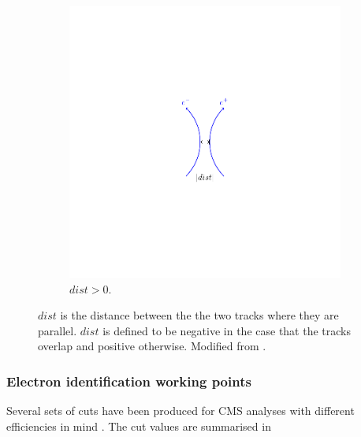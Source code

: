 \begin{figure}[htbp]
\begin{subfigure}{0.45\textwidth}
    \includegraphics[trim = 40mm 40mm 40mm 40mm, clip,width=\textwidth]{dist_p}
    \caption{$dist>0$.}
    \label{fig:dist_p}
  \end{subfigure}
  \caption{$dist$ is the distance between the the two tracks where they are
parallel. $dist$ is defined to be negative in the case that the tracks overlap
and positive otherwise. Modified from \cite{barge2009conversion}. } 
\label{fig:dist}
\end{figure}

\subsubsection{Electron identification working points}

Several sets of cuts have been produced for CMS analyses with different
efficiencies in mind \cite{nikos,daskalakis2009data,simplecutbasedeleid}. 
The cut values are summarised in 

